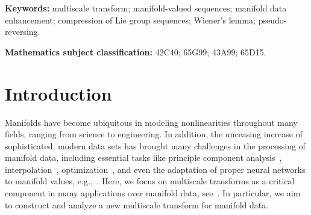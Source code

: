 \documentclass[12pt]{article}
\newcommand{\nir}[1]{{\color{red}{#1}}}
\begin{document}

\noindent\makebox[\linewidth]{\rule{\textwidth}{1pt}}

\textbf{Keywords:} multiscale transform; manifold-valued sequences; manifold data enhancement; compression of Lie group sequences; Wiener's lemma; pseudo-reversing.

\noindent\makebox[\linewidth]{\rule{\textwidth}{1pt}}

\textbf{Mathematics subject classification:}  42C40; 65G99; 43A99; 65D15.

\section{Introduction}

Manifolds have become ubiquitous in modeling nonlinearities throughout many fields, ranging from science to engineering. In addition, the unceasing increase of sophisticated, modern data sets has brought many challenges in the processing of manifold data, including essential tasks like principle component analysis~\cite{mardia2022principal}, interpolation~\cite{samir2019c1}, optimization~\cite{boumal2023introduction}, and even the adaptation of proper neural networks to manifold values, e.g.,~\cite{chakraborty2020manifoldnet, gao2022curvature}. Here, we focus on multiscale transforms as a critical component in many applications over manifold data, see~\cite{cotronei2019level, mattar2023pyramid, rahman2005multiscale}. In particular, we aim to construct and analyze a new multiscale transform for manifold data.
\end{document}
